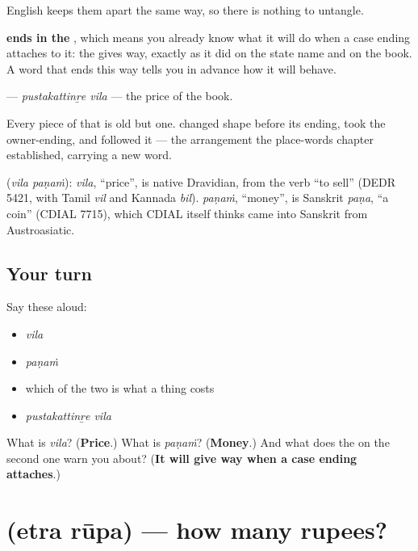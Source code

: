 English keeps them apart the same way, so there is nothing to untangle.

\textbf{ ends in the }, which means you already know what it will do when a case ending attaches to it: the \textbf{} gives way, exactly as it did on the state name and on the book. A word that ends this way tells you in advance how it will behave.

\textbf{ } — \emph{pustakattinṟe vila} — the price of the book.

Every piece of that is old but one. \textbf{} changed shape before its ending, took the owner-ending, and \textbf{} followed it — the arrangement the place-words chapter established, carrying a new word.

\begin{cousinweb}
\textbf{ } (\emph{vila paṇaṁ}): \emph{vila}, \textquotedblleft{}price\textquotedblright{}, is native Dravidian, from the verb \textquotedblleft{}to sell\textquotedblright{} (DEDR 5421, with Tamil \emph{vil} and Kannada \emph{bil}). \emph{paṇaṁ}, \textquotedblleft{}money\textquotedblright{}, is Sanskrit \emph{paṇa}, \textquotedblleft{}a coin\textquotedblright{} (CDIAL 7715), which CDIAL itself thinks came into Sanskrit from Austroasiatic.
\end{cousinweb}

\subsection*{Your turn}
Say these aloud:

\begin{itemize}
\raggedright
  \item \emph{vila}
  \item \emph{paṇaṁ}
  \item which of the two is what a thing costs
  \item \emph{pustakattinṟe vila}
\end{itemize}

\begin{tcolorbox}[breakable,colback=teal!4,colframe=teal!35!black,title={Before you move on}]
What is \emph{vila}? (\textbf{Price}.) What is \emph{paṇaṁ}? (\textbf{Money}.) And what does the \textbf{} on the second one warn you about? (\textbf{It will give way when a case ending attaches}.)
\end{tcolorbox}
\section[\texorpdfstring{\ml{എത്ര} \ml{രൂപ} (etra rūpa)}{എത്ര രൂപ (etra rūpa)}]{  (etra rūpa) — how many rupees?}

